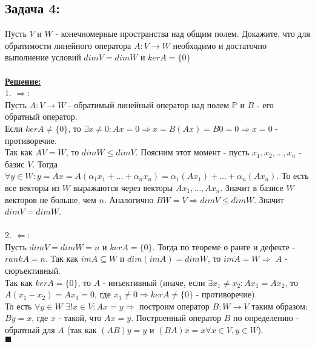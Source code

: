 \documentclass[a4paper,12pt,titlepage,final]{article}
\begin{document}
\subsection*{Задача 4:}
\noindent Пусть $V$ и $W$ - конечномерные пространства над общим полем. Докажите, что для обратимости линейного оператора $A: V \rightarrow W$
необходимо и достаточно выполнение условий $dim V = dim W$ и $ker A = \{0\}$ \\ \\
\textbf{\underline{Решение:}} \\
1. $\Rightarrow:$ \\
Пусть $A: V \rightarrow W$ - обратимый линейный оператор над полем $\mathbb{P}$ и $B$ - его обратный оператор. \\
Если $kerA \neq \{0\}$, то $\exists x \neq 0: Ax = 0 \Rightarrow x = B(Ax) = B0 = 0 \Rightarrow x = 0$ - противоречие. \\
Так как $AV = W$, то $dimW \leq dimV$. Поясним этот момент - пусть $x_1, x_2, ..., x_n$ - базис $V$.
Тогда $\forall y \in W: y = Ax = A(\alpha_1 x_1 + ... + \alpha_n x_n) = \alpha_1 (Ax_1) + ... + \alpha_n  (Ax_n)$.
То есть все векторы из $W$ выражаются через векторы $Ax_1, ... , Ax_n$. Значит в базисе $W$ векторов не больше, чем $n$.
Аналогично $BW = V \Rightarrow dimV \leq dimW$. Значит $dimV = dimW$. \\ \\
2. $\Leftarrow$: \\
Пусть $dimV = dimW = n$ и $kerA = \{0\}$. Тогда по теореме о ранге и дефекте - $rankA = n$.
Так как $imA \subseteq W$ и $dim(imA) = dimW$, то $imA = W \Rightarrow$ $A$ - сюръективный. \\
Так как $kerA = \{0\}$, то $A$ - инъективный (иначе, если $\exists x_1 \neq x_2: Ax_1 = Ax_2$, то $A(x_1 - x_2) = Ax_3 = 0$, где $x_3 \neq 0 \Rightarrow
kerA \neq \{0\}$ - противоречие). \\
То есть $\forall y \in W$ $\exists ! x \in V: Ax = y \Rightarrow$ построим оператор $B: W \rightarrow V$ таким образом: $By = x$, где $x$ - такой, что $Ax = y$.
Построенный оператор $B$ по определению - обратный для $A$ (так как $(AB)y = y$ и $(BA)x = x \forall x \in V, y \in W$). \\ $\blacksquare$ \\ \\ \\


\end{document}
